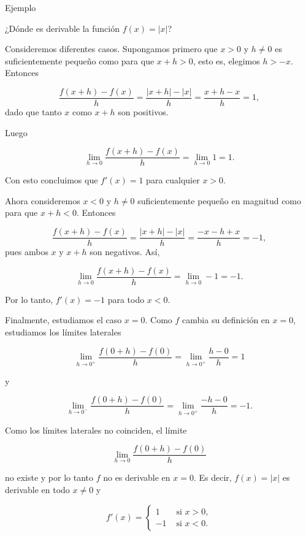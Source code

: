 \documentclass[
  letterpaper,
]{book}
\theoremstyle{plain}
\theoremstyle{remark}
\begin{document}
Ejemplo

¿Dónde es derivable la función \(f(x)=|x|\)?

\begin{tcolorbox}[enhanced jigsaw, opacityback=0, left=2mm, opacitybacktitle=0.6, toprule=.15mm, bottomrule=.15mm, colbacktitle=quarto-callout-tip-color!10!white, titlerule=0mm, bottomtitle=1mm, title=\textcolor{quarto-callout-tip-color}{\faLightbulb}\hspace{0.5em}{Solución}, toptitle=1mm, colframe=quarto-callout-tip-color-frame, colback=white, breakable, rightrule=.15mm, arc=.35mm, leftrule=.75mm, coltitle=black]

Consideremos diferentes casos. Supongamos primero que \(x>0\) y
\(h\neq 0\) es suficientemente pequeño como para que \(x+h>0\), esto es,
elegimos \(h>-x\). Entonces

\[
\frac{f(x+h)-f(x)}{h}=\frac{|x+h|-|x|}{h}=\frac{x+h-x}{h}=1,
\] dado que tanto \(x\) como \(x+h\) son positivos.

Luego

\[
\lim_{h\to 0} \frac{f(x+h)-f(x)}{h} = \lim_{h\to 0} 1=1.
\]

Con esto concluimos que \(f'(x)=1\) para cualquier \(x>0\).

Ahora consideremos \(x<0\) y \(h\neq 0\) suficientemente pequeño en
magnitud como para que \(x+h<0\). Entonces

\[
\frac{f(x+h)-f(x)}{h}=\frac{|x+h|-|x|}{h}=\frac{-x-h+x}{h}=-1,
\] pues ambos \(x\) y \(x+h\) son negativos. Así,

\[
\lim_{h\to 0} \frac{f(x+h)-f(x)}{h} = \lim_{h\to 0} -1=-1.
\]

Por lo tanto, \(f'(x)=-1\) para todo \(x<0\).

Finalmente, estudiamos el caso \(x=0\). Como \(f\) cambia su definición
en \(x=0\), estudiamos los límites laterales

\[
\lim_{h\to 0^+} \frac{f(0+h)-f(0)}{h}=\lim_{h\to 0^+} \frac{h-0}{h}= 1
\]

y

\[
\lim_{h\to 0^-} \frac{f(0+h)-f(0)}{h}=\lim_{h\to 0^+} \frac{-h-0}{h}= -1.
\]

Como los límites laterales no coinciden, el límite

\[
\lim_{h\to 0} \frac{f(0+h)-f(0)}{h}
\]

no existe y por lo tanto \(f\) no es derivable en \(x=0\). Es decir,
\(f(x)=|x|\) es derivable en todo \(x\neq 0\) y

\[
f'(x)=
\begin{cases}
1 & \text{ si } x>0,\\
-1 & \text{ si } x<0.
\end{cases}
\]

\end{tcolorbox}
\end{document}

